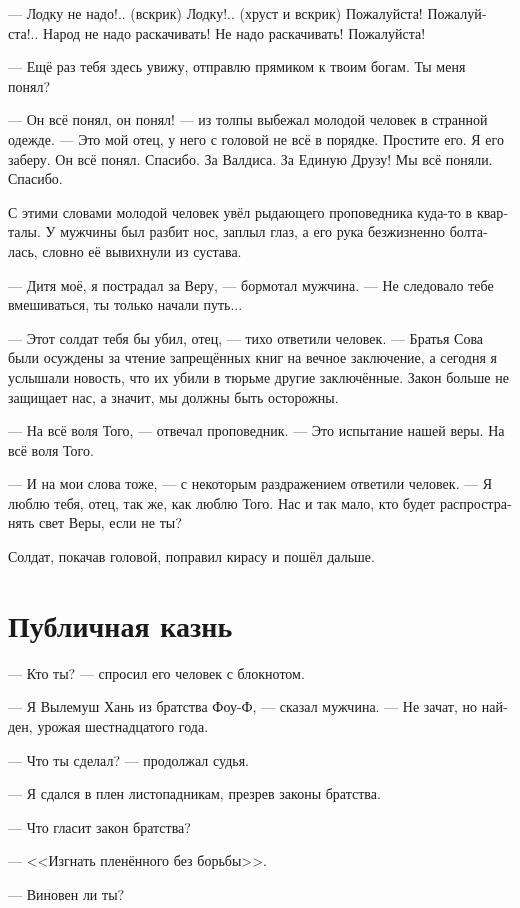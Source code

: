 \documentclass[a4paper,12pt,fleqn]{book}\usepackage{cooltooltips}\usepackage{polyglossia}\setdefaultlanguage[babelshorthands=true]{russian}\setotherlanguage{english}\defaultfontfeatures{Ligatures=TeX,Mapping=tex-text} \usepackage{xcolor}\definecolor{lightgray}{HTML}{bbbbbb}\color{lightgray}\newcommand{\ml}[3]{\textenglish{\textcolor{black}{#3}}}
\begin{document}
--- Лодку не надо!.. (вскрик)
Лодку!.. (хруст и вскрик)
Пожалуйста!
Пожалуйста!..
Народ не надо раскачивать!
Не надо раскачивать!
Пожалуйста!

--- Ещё раз тебя здесь увижу, отправлю прямиком к твоим богам.
Ты меня понял?

--- Он всё понял, он понял! --- из толпы выбежал молодой человек в странной одежде.
--- Это мой отец, у него с головой не всё в порядке.
Простите его.
Я его заберу.
Он всё понял.
Спасибо.
За Валдиса.
За Единую Друзу!
Мы всё поняли.
Спасибо.

С этими словами молодой человек увёл рыдающего проповедника куда-то в кварталы.
У мужчины был разбит нос, заплыл глаз, а его рука безжизненно болталась, словно её вывихнули из сустава.

--- Дитя моё, я пострадал за Веру, --- бормотал мужчина.
--- Не следовало тебе вмешиваться, ты только начали путь...

--- Этот солдат тебя бы убил, отец, --- тихо ответили человек.
--- Братья Сова были осуждены за чтение запрещённых книг на вечное заключение, а сегодня я услышали новость, что их убили в тюрьме другие заключённые.
Закон больше не защищает нас, а значит, мы должны быть осторожны.

--- На всё воля Того, --- отвечал проповедник.
--- Это испытание нашей веры.
На всё воля Того.

--- И на мои слова тоже, --- с некоторым раздражением ответили человек.
--- Я люблю тебя, отец, так же, как люблю Того.
Нас и так мало, кто будет распространять свет Веры, если не ты?

Солдат, покачав головой, поправил кирасу и пошёл дальше.

\section{Публичная казнь}

--- Кто ты? --- спросил его человек с блокнотом.

--- Я Вылемуш Хань из братства Фоу-Ф, --- сказал мужчина.
--- Не зачат, но найден, урожая шестнадцатого года.

--- Что ты сделал? --- продолжал судья.

--- Я сдался в плен листопадникам, презрев законы братства.

--- Что гласит закон братства?

--- <<Изгнать пленённого без борьбы>>.

--- Виновен ли ты?
\end{document}
